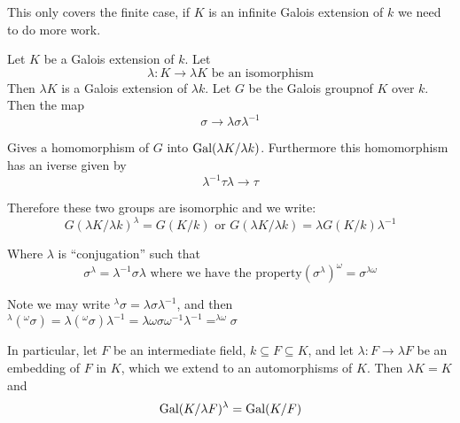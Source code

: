 \begin{remark}
    This only covers the finite case, if $K$ is an infinite Galois extension of $k$ we need to do more work.
\end{remark}

Let $K$ be a Galois extension of $k$. Let \[\lambda\colon K\rightarrow \lambda K \text{ be an isomorphism}\]
Then $\lambda K$ is a Galois extension of $\lambda k$. Let $G$ be the Galois groupnof $K$ over $k$. Then the map\[
        \sigma\rightarrow \lambda \sigma \lambda^{-1}    
\] 

Gives a homomorphism of $G$ into $\text{Gal}(\lambda K/\lambda k)$. Furthermore this homomorphism has an iverse given by \[\lambda^{-1}\tau\lambda\rightarrow \tau \]

Therefore these two groups are isomorphic and we write:\[
    {G(\lambda K/\lambda k)}^\lambda = G(K/k) \text{ or } {G(\lambda K/\lambda k)} = \lambda G(K/k) \lambda^{-1}
\]

Where $\lambda$ is ``conjugation'' such that\[
    \sigma^\lambda = \lambda^{-1}\sigma\lambda \text{ where we have the property} {(\sigma^\lambda)}^\omega = \sigma^{\lambda\omega}    
\]
\begin{bergman}
    Note we may write $^\lambda\sigma = \lambda\sigma\lambda^{-1}$, and then $^\lambda(^\omega \sigma) = \lambda(^\omega \sigma)\lambda^{-1} = \lambda\omega \sigma\omega^{-1}\lambda^{-1} = ^{\lambda\omega}\sigma$
\end{bergman}


In particular, let $F$ be an intermediate field, $k\subseteq F\subseteq K$, and let $\lambda\colon F\rightarrow \lambda F$ be an embedding of $F$ in $K$, which we extend to an automorphisms of $K$. Then $\lambda K = K$ and \[
        \text{Gal}(K/\lambda F)^\lambda = \text{Gal}(K/F)    
\]

